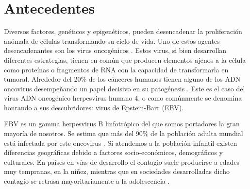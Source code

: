 \documentclass[11pt,letterpaper,titlepage]{article} %
\begin{document}
\section{Antecedentes}

Diversos factores, genéticos y epigenéticos, pueden desencadenar la
proliferación anómala de células transformando su ciclo de vida. Uno de estos
agentes desencadenantes son los virus oncogénicos \cite{Gupta2014,Damania2015}. Estos virus,
si bien desarrollan diferentes estrategias, tienen en común que producen
elementos ajenos a la célula como proteínas o fragmentos de RNA con la capacidad
de transformarla en tumoral. Alrededor del 20$\%$ de los cánceres humanos tienen
alguno de los ADN oncovirus desempeñando un papel decisivo en su patogénesis
\cite{Parkin2006,Dayaram2008}. Este es el caso del virus ADN oncogénico herpesvirus humano
4, o como comúnmente se denomina honrando a sus descubridores: virus de
Epstein-Barr (EBV).

EBV es un gamma herpesvirus B linfotrópico del que somos portadores la gran
mayoría de nosotros. Se estima que más del 90$\%$ de la población adulta mundial
está infectada por este oncovirus \cite{Cohen2000}. Si atendemos a la población
infantil existen diferencias geográficas debido a factores socio-económicos, demográficos y
culturales. En países en vías de desarrollo el contagio suele producirse a edades muy
tempranas, en la niñez, mientras que en sociedades desarrolladas dicho contagio
se retrasa mayoritariamente a la adolescencia \cite{Dowd2013}.
\end{document}
